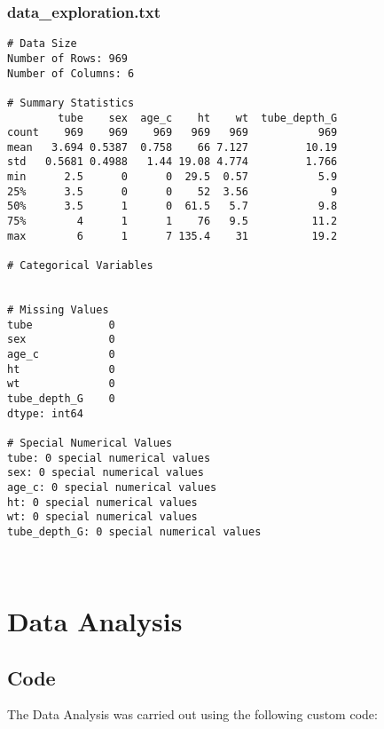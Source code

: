 \documentclass[11pt]{article}
\begin{document}
\subsubsection*{data\_exploration.txt}

\begin{Verbatim}[tabsize=4]
# Data Size
Number of Rows: 969
Number of Columns: 6

# Summary Statistics
        tube    sex  age_c    ht    wt  tube_depth_G
count    969    969    969   969   969           969
mean   3.694 0.5387  0.758    66 7.127         10.19
std   0.5681 0.4988   1.44 19.08 4.774         1.766
min      2.5      0      0  29.5  0.57           5.9
25%      3.5      0      0    52  3.56             9
50%      3.5      1      0  61.5   5.7           9.8
75%        4      1      1    76   9.5          11.2
max        6      1      7 135.4    31          19.2

# Categorical Variables


# Missing Values
tube            0
sex             0
age_c           0
ht              0
wt              0
tube_depth_G    0
dtype: int64

# Special Numerical Values
tube: 0 special numerical values
sex: 0 special numerical values
age_c: 0 special numerical values
ht: 0 special numerical values
wt: 0 special numerical values
tube_depth_G: 0 special numerical values



\end{Verbatim}

\section{Data Analysis}
\subsection{{Code}}
The Data Analysis was carried out using the following custom code:
\end{document}
